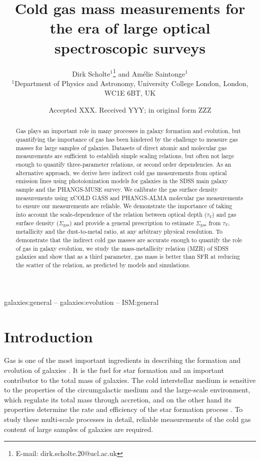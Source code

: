\documentclass[fleqn,usenatbib]{mnras}
\title[Cold gas masses for spectroscopic surveys]{Cold gas mass measurements for the era of large optical spectroscopic surveys}
\author[Scholte \& Saintonge]{
Dirk Scholte$^{1}$\thanks{E-mail: dirk.scholte.20@ucl.ac.uk} and 
Am\'elie Saintonge$^{1}$
\\
$^{1}$Department of Physics and Astronomy, University College London, London, WC1E 6BT, UK
}
\date{Accepted XXX. Received YYY; in original form ZZZ}
\begin{document}
\label{firstpage}
\pagerange{\pageref{firstpage}--\pageref{lastpage}}
\maketitle

\begin{abstract}
Gas plays an important role in many processes in galaxy formation and evolution, but quantifying the importance of gas has been hindered by the challenge to measure gas masses for large samples of galaxies. Datasets of direct atomic and molecular gas measurements are sufficient to establish simple scaling relations, but often not large enough to quantify three-parameter relations, or second order dependencies.  As an alternative approach, we derive here indirect cold gas measurements from optical emission lines using photoionization models for galaxies in the SDSS main galaxy sample and the PHANGS-MUSE survey. We calibrate the gas surface density measurements using xCOLD GASS and PHANGS-ALMA molecular gas measurements to ensure our measurements are reliable. We demonstrate the importance of taking into account the scale-dependence of the relation between optical depth ($\tau_V$) and gas surface density ($\Sigma_{\textrm{gas}}$) and provide a general prescription to estimate $\Sigma_{\textrm{gas}}$ from $\tau_V$, metallicity and the dust-to-metal ratio, at any arbitrary physical resolution. To demonstrate that the indirect cold gas masses are accurate enough to quantify the role of gas in galaxy evolution, we study the mass-metallicity relation (MZR) of SDSS galaxies and show that as a third parameter, gas mass is better than SFR at reducing the scatter of the relation, as predicted by models and simulations. 
\end{abstract}

\begin{keywords}
galaxies:general -- galaxies:evolution -- ISM:general
\end{keywords}



\section{Introduction}
Gas is one of the most important ingredients in describing the formation and evolution of galaxies \citep{tinsley1980}. It is the fuel for star formation and an important contributor to the total mass of galaxies. The cold interstellar medium is sensitive to the properties of the circumgalactic medium and the large-scale environment, which regulate its total mass through accretion, and on the other hand its properties determine the rate and efficiency of the star formation process \citep[e.g.][]{saintonge22}. To study these multi-scale processes in detail, reliable measurements of the cold gas content of large samples of galaxies are required.
\end{document}
